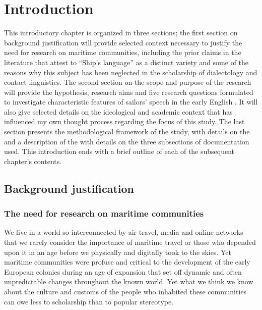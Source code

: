 \chapter{Introduction}

This introductory chapter is organized in three sections; the first section on background justification will provide selected context necessary to justify the need for research on maritime communities, including the prior claims in the literature that attest to “Ship’s language” as a distinct variety and some of the reasons why this subject has been neglected in the scholarship of dialectology and contact linguistics. The second section on the scope and purpose of the research will provide the hypothesis, research aims and five research questions formulated to investigate characteristic features of sailors’ speech in the early English . It will also give selected details on the ideological and academic context that has influenced my own thought process regarding the focus of this study. The last section presents the methodological framework of the study, with details on the  and a description of the  with details on the three subsections of documentation used. This introduction ends with a brief outline of each of the subsequent chapter’s contents.



\section{{Background} {justification} }%



\subsection{{The} {need} {for} {research} {on} {maritime} {communities}}%



We live in a world so interconnected by air travel, media and online networks that we rarely consider the importance of maritime travel or those who depended upon it in an age before we physically and digitally took to the skies. Yet maritime communities were profuse and critical to the development of the early European colonies during an age of expansion that set off dynamic and often unpredictable changes throughout the known world. Yet what we think we know about the culture and customs of the people who inhabited these communities can owe less to scholarship than to popular stereotype. 




